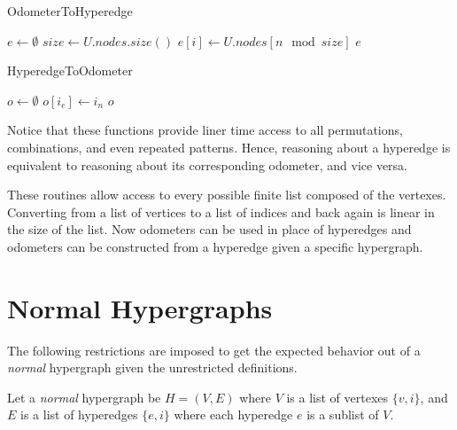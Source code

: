 \begin{algorithm}
    \centering
	\caption{OdometerToHyperedge}\label{OtoE}
	\begin{algorithmic}[1]
		\State $e \gets \emptyset$ 
		\State $size \gets U.nodes.size()$ 
		\State $e[i] \gets U.nodes[ n \mod size ]$ 
		\EndFor
		\State \Return $e$
		\EndFunction
	\end{algorithmic}
\end{algorithm}

\begin{algorithm}
    \centering
	\caption{HyperedgeToOdometer}\label{EtoO}
	\begin{algorithmic}[1]
		\State $o \gets \emptyset$ 
		  
		 
		\State $o[i_e] \gets i_n$ 
		\EndIf
		\EndFor
		\EndFor
		\State \Return $o$
		\EndFunction
	\end{algorithmic}
\end{algorithm}

Notice that these functions provide liner time access to all permutations, combinations, and even repeated patterns. Hence, reasoning about a hyperedge is equivalent to reasoning about its corresponding odometer, and vice versa. 

These routines allow access to every possible finite list composed of the vertexes. Converting from a list of vertices to a list of indices and back again is linear in the size of the list. Now odometers can be used in place of hyperedges and odometers can be constructed from a hyperedge given a specific hypergraph.

\section{Normal Hypergraphs }



 The following restrictions are imposed to get the expected behavior out of a \textit{normal} hypergraph given the unrestricted definitions. 
 
 \begin{definition}
	
Let a \textit{normal} hypergraph be $H = (V,E)$ where $V$ is a list of vertexes $\{v,i\}$, and $E$ is a list of hyperedges $\{e,i\}$ where each hyperedge $e$ is a sublist of $V$. 
\end{definition}


